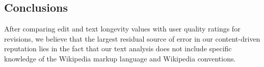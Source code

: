 \subsection{Conclusions}

After comparing edit and text longevity values with user quality
ratings for revisions, we believe that the largest residual source of
error in our content-driven reputation lies in the fact that our text
analysis does not include specific knowledge of the Wikipedia markup
language and Wikipedia conventions. 

